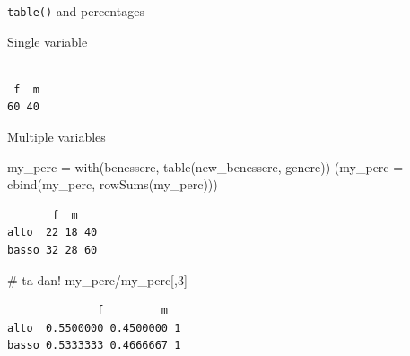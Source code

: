 \documentclass[
  ignorenonframetext,
]{beamer}
\newenvironment{Shaded}{\begin{snugshade}}{\end{snugshade}}
\newcommand{\AttributeTok}[1]{\textcolor[rgb]{0.00,0.34,0.68}{#1}}
\newcommand{\CommentTok}[1]{\textcolor[rgb]{0.54,0.53,0.53}{#1}}
\newcommand{\DecValTok}[1]{\textcolor[rgb]{0.69,0.50,0.00}{#1}}
\newcommand{\FunctionTok}[1]{\textcolor[rgb]{0.39,0.29,0.61}{#1}}
\newcommand{\NormalTok}[1]{\textcolor[rgb]{0.12,0.11,0.11}{#1}}
\newcommand{\OtherTok}[1]{\textcolor[rgb]{0.00,0.43,0.16}{#1}}
\newcommand{\SpecialCharTok}[1]{\textcolor[rgb]{0.24,0.68,0.91}{#1}}
\begin{document}
\begin{frame}[fragile]{\texttt{table()} and percentages}
\protect\hypertarget{table-and-percentages}{}
\small

Single variable

\begin{Shaded}
\end{Shaded}

\begin{verbatim}

 f  m 
60 40 
\end{verbatim}

Multiple variables

\begin{Shaded}
\begin{Highlighting}[]
\NormalTok{my\_perc }\OtherTok{=} \FunctionTok{with}\NormalTok{(benessere, }\FunctionTok{table}\NormalTok{(new\_benessere, genere))}
\NormalTok{(}\AttributeTok{my\_perc =} \FunctionTok{cbind}\NormalTok{(my\_perc, }\FunctionTok{rowSums}\NormalTok{(my\_perc)))}
\end{Highlighting}
\end{Shaded}

\begin{verbatim}
       f  m   
alto  22 18 40
basso 32 28 60
\end{verbatim}
\end{frame}

\begin{frame}[fragile]{}
\protect\hypertarget{section-2}{}
\begin{Shaded}
\begin{Highlighting}[]
\CommentTok{\# ta{-}dan!}
\NormalTok{my\_perc}\SpecialCharTok{/}\NormalTok{my\_perc[,}\DecValTok{3}\NormalTok{]}
\end{Highlighting}
\end{Shaded}

\begin{verbatim}
              f         m  
alto  0.5500000 0.4500000 1
basso 0.5333333 0.4666667 1
\end{verbatim}
\end{frame}
\end{document}
